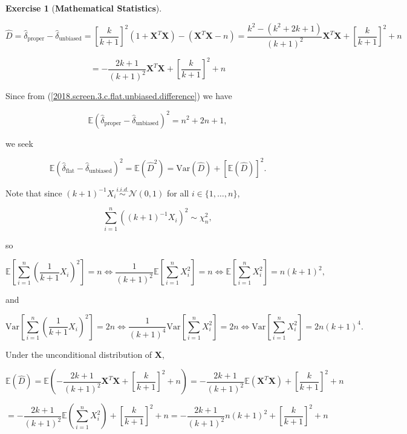 \documentclass{article}
\theoremstyle{definition}
\newtheorem{exercise}{Exercise}
\theoremstyle{definition}
\theoremstyle{definition}
\theoremstyle{definition}
\theoremstyle{definition}
\newcommand{\E}{\mathbb{E}}
\newcommand{\Var}{\mathrm{Var}}
\begin{document}
\begin{exercise}[\textbf{Mathematical Statistics}]
\begin{enumerate}[(a)]
\[
\hat{D} = \hat{\delta}_{\text{proper}}  - \hat{\delta}_{\text{unbiased}} =  \left[ \frac{k}{k+1} \right]^2 \left(1   +     \boldsymbol{X}^T \boldsymbol{X} \right) - \left( \boldsymbol{X}^T\boldsymbol{X} - n \right) = \frac{k^2 - (k^2 + 2k + 1)}{(k+1)^2}  \boldsymbol{X}^T\boldsymbol{X} + \left[ \frac{k}{k+1} \right]^2 + n
\]

\begin{equation}
= -\frac{2k + 1}{(k+1)^2}  \boldsymbol{X}^T\boldsymbol{X} + \left[ \frac{k}{k+1} \right]^2 + n
\end{equation}



Since from  (\ref{2018.screen.3.c.flat.unbiased.difference}) we have

\[
\E \left( \hat{\delta}_{\text{proper}}  - \hat{\delta}_{\text{unbiased}} \right)^2 = n^2 + 2n + 1,
\]

we seek

\[
\E \left( \hat{\delta}_{\text{flat}}  - \hat{\delta}_{\text{unbiased}} \right)^2= \E( \hat{D}^2) = \Var(\hat{D}) + \left[\E(\hat{D}) \right]^2.
\]

Note that since \((k+1)^{-1} X_i \overset{i.i.d.}{\sim} \mathcal{N}(0,1)\) for all \(i \in \{1, \ldots, n\}\), 

\[
\sum_{i=1}^n \left( (k+1)^{-1} X_i \right)^2 \sim \chi_n^2,
\]

so

\[
\E \left[ \sum_{i=1}^n \left( \frac{1}{k+1} X_i \right)^2  \right] = n \iff \frac{1}{(k+1)^2} \E \left[ \sum_{i=1}^n X_i ^2  \right] = n \iff  \E \left[ \sum_{i=1}^n X_i ^2  \right] = n(k+1)^2,
\]

and

\[
\Var \left[ \sum_{i=1}^n \left( \frac{1}{k+1} X_i \right)^2  \right] = 2n \iff \frac{1}{(k+1)^4} \Var \left[ \sum_{i=1}^n X_i ^2  \right] = 2n \iff  \Var \left[ \sum_{i=1}^n X_i ^2  \right] = 2n(k+1)^4.
\]

Under the unconditional distribution of \(\boldsymbol{X}\),

\[
\E \left(\hat{D} \right) = \E \left( -\frac{2k + 1}{(k+1)^2}  \boldsymbol{X}^T\boldsymbol{X} + \left[ \frac{k}{k+1} \right]^2 + n \right)  =  - \frac{2k +1}{(k+1)^2}\E \left(  \boldsymbol{X}^T\boldsymbol{X}  \right) + \left[ \frac{k}{k+1} \right]^2 + n
\]

\[
=  - \frac{2k +1}{(k+1)^2}\E \left(  \sum_{i=1}^n X_i^2  \right) + \left[ \frac{k}{k+1} \right]^2 + n =  - \frac{2k +1}{(k+1)^2} n(k+1)^2 + \left[ \frac{k}{k+1} \right]^2 + n
\]


\end{enumerate}
\end{exercise}
\end{document}
